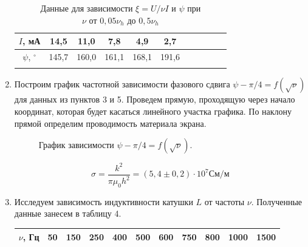 \documentclass[a4paper, 12pt]{article}%
\begin{document}
\begin{enumerate}
\begin{longtable} {|c|c|c|c|c|c|c|c|c|c|c|}
		$I$, мА& 14,5 & 11,0 & 7,8 & 4,9 & 2,7 &  &  &  &  &   \\ \hline
		
		$\psi$, $^\circ$ & 145,7 & 160,0 & 161,1 & 168,1 & 191,6 &  &  &  &  &   \\ \hline
		
		\caption{Данные для зависимости $\xi = U/\nu I $ и $\psi$ при $\nu \text{ от } 0,05\nu_h \text{ до }  0,5\nu_h$}
	\end{longtable}	

	\item Построим график частотной зависимости фазового сдвига $\psi - \pi/4 = f(\sqrt{\nu})$ для данных из пунктов 3 и 5. Проведем прямую, проходящую через начало координат, которая будет касаться линейного участка графика. По наклону прямой определим проводимость материала экрана.
	
	\begin{figure}[H]
		\caption{График зависимости $\psi - \pi/4 = f(\sqrt{\nu})$.}
	\end{figure}

	$$ \sigma = \frac{k^2}{\pi \mu_0 h^2} = (5,4 \pm 0,2)\cdot 10^7 \text{См/м} $$
	
	\item Исследуем зависимость индуктивности катушки $L$ от частоты $\nu$. Полученные данные занесем в таблицу 4.
	
		\begin{longtable} {|c|c|c|c|c|c|c|c|c|c|c|}
		\hline
		$\nu$, Гц& 50 & 150 & 250 & 400 & 500 & 600 & 750 & 800 & 1000 & 1500  \\ \hline
		

\end{longtable}
\end{enumerate}
\end{document}
